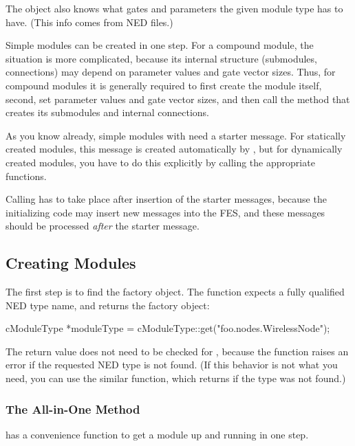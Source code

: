 \begin{ned}
The  object also knows what gates and
parameters the given module type has to have. (This info comes from
NED files.)

Simple modules can be created in one step. For a compound module, the
situation is more complicated, because its internal structure
(submodules, connections) may depend on parameter values and gate
vector sizes. Thus, for compound modules it is generally required to
first create the module itself, second, set parameter values and gate
vector sizes, and then call the method that creates its submodules and
internal connections.

As you know already, simple modules with  need a
starter message. For statically created
modules, this message is created automatically by {\opp}, but for
dynamically created modules, you have to do this explicitly by calling
the appropriate functions.

Calling  has to take place after insertion of the
starter messages, because the initializing code may insert new messages
into the FES, and these messages should be processed
\textit{after} the starter message.


\subsection{Creating Modules}
\label{sec:simple-modules:dynamic-creation:api}

The first step is to find the factory object. The 
function expects a fully qualified NED type name, and returns the factory
object:

\begin{cpp}
cModuleType *moduleType = cModuleType::get("foo.nodes.WirelessNode");
\end{cpp}

The return value does not need to be checked for , because
the function raises an error if the requested NED type is not found.
(If this behavior is not what you need, you can use the similar
 function, which returns  if the type
was not found.)

\subsubsection{The All-in-One Method}
\label{sec:simple-modules:dynamic:createscheduleinit}

 has a
convenience function to get a module up and running in one step.


\end{ned}
